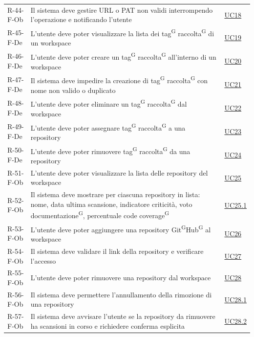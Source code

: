 \documentclass[a4paper, 11pt]{article}
\begin{document}
\begin{longtable}[c]{ >{\centering\arraybackslash}m{2.5cm} >{\centering\arraybackslash}m{8.3cm} >{\centering\arraybackslash}m{3.5cm} }
    R-44-F-Ob & Il sistema deve gestire URL o PAT non validi interrompendo l'operazione e notificando l'utente & \hyperref[UC18]{UC18} \\
    R-45-F-De & L'utente deve poter visualizzare la lista dei tag\textsuperscript{G} raccolta\textsuperscript{G} di un workspace & \hyperref[UC19]{UC19} \\
    R-46-F-De & L'utente deve poter creare un tag\textsuperscript{G} raccolta\textsuperscript{G} all'interno di un workspace & \hyperref[UC20]{UC20} \\
    R-47-F-De & Il sistema deve impedire la creazione di tag\textsuperscript{G} raccolta\textsuperscript{G} con nome non valido o duplicato & \hyperref[UC21]{UC21} \\
    R-48-F-De & L'utente deve poter eliminare un tag\textsuperscript{G} raccolta\textsuperscript{G} dal workspace & \hyperref[UC22]{UC22} \\
    R-49-F-De & L'utente deve poter assegnare tag\textsuperscript{G} raccolta\textsuperscript{G} a una repository & \hyperref[UC23]{UC23} \\
    R-50-F-De & L'utente deve poter rimuovere tag\textsuperscript{G} raccolta\textsuperscript{G} da una repository & \hyperref[UC24]{UC24} \\
    R-51-F-Ob & L'utente deve poter visualizzare la lista delle repository del workspace & \hyperref[UC25]{UC25} \\
    R-52-F-Ob & Il sistema deve mostrare per ciascuna repository in lista: nome, data ultima scansione, indicatore criticità, voto documentazione\textsuperscript{G}, percentuale code coverage\textsuperscript{G} & \hyperref[UC25.1]{UC25.1} \\
    R-53-F-Ob & L'utente deve poter aggiungere una repository Git\textsuperscript{G}Hub\textsuperscript{G} al workspace & \hyperref[UC26]{UC26} \\
    R-54-F-Ob & Il sistema deve validare il link della repository e verificare l'accesso & \hyperref[UC27]{UC27} \\
    R-55-F-Ob & L'utente deve poter rimuovere una repository dal workspace & \hyperref[UC28]{UC28} \\
    R-56-F-Ob & Il sistema deve permettere l'annullamento della rimozione di una repository & \hyperref[UC28.1]{UC28.1} \\
    R-57-F-Ob & Il sistema deve avvisare l'utente se la repository da rimuovere ha scansioni in corso e richiedere conferma esplicita & \hyperref[UC28.2]{UC28.2} \\

\end{longtable}
\end{document}
